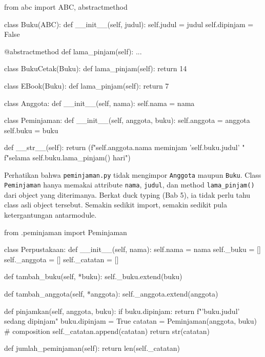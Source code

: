 \begin{kode}
from abc import ABC, abstractmethod

class Buku(ABC):
    def __init__(self, judul):
        self.judul = judul
        self.dipinjam = False

    @abstractmethod
    def lama_pinjam(self):
        ...

class BukuCetak(Buku):
    def lama_pinjam(self):
        return 14

class EBook(Buku):
    def lama_pinjam(self):
        return 7
\end{kode}

\begin{kode}
class Anggota:
    def __init__(self, nama):
        self.nama = nama
\end{kode}

\begin{kode}
class Peminjaman:
    def __init__(self, anggota, buku):
        self.anggota = anggota
        self.buku = buku

    def __str__(self):
        return (f"{self.anggota.nama} meminjam '{self.buku.judul}' "
                f"selama {self.buku.lama_pinjam()} hari")
\end{kode}

Perhatikan bahwa \texttt{peminjaman.py} tidak mengimpor \texttt{Anggota} maupun \texttt{Buku}. Class \texttt{Peminjaman} hanya memakai attribute \texttt{nama}, \texttt{judul}, dan method \texttt{lama\_pinjam()} dari object yang diterimanya. Berkat duck typing (Bab 5), ia tidak perlu tahu class asli object tersebut. Semakin sedikit import, semakin sedikit pula ketergantungan antarmodule.

\begin{kode}
from .peminjaman import Peminjaman

class Perpustakaan:
    def __init__(self, nama):
        self.nama = nama
        self._buku = []
        self._anggota = []
        self._catatan = []

    def tambah_buku(self, *buku):
        self._buku.extend(buku)

    def tambah_anggota(self, *anggota):
        self._anggota.extend(anggota)

    def pinjamkan(self, anggota, buku):
        if buku.dipinjam:
            return f"'{buku.judul}' sedang dipinjam"
        buku.dipinjam = True
        catatan = Peminjaman(anggota, buku)        # composition
        self._catatan.append(catatan)
        return str(catatan)

    def jumlah_peminjaman(self):
        return len(self._catatan)
\end{kode}

